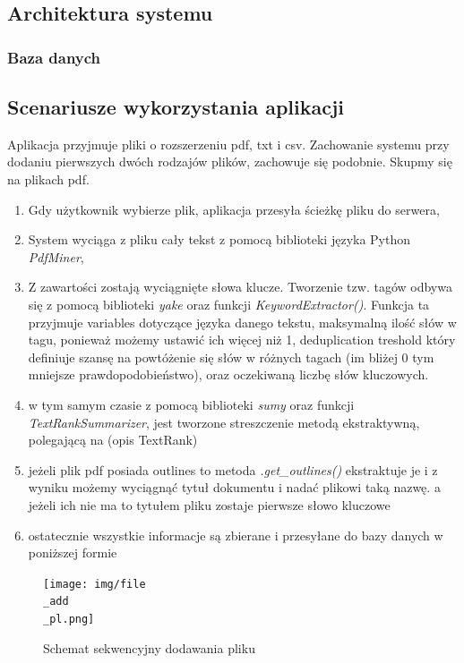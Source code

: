 \documentclass[12pt,a4paper,twoside]{article}
\begin{document}
\subsection{Architektura systemu} %
\subsubsection*{Baza danych}
\newpage
\subsection{Scenariusze wykorzystania aplikacji}
Aplikacja przyjmuje pliki o rozszerzeniu pdf, txt i csv. Zachowanie systemu przy dodaniu pierwszych dwóch rodzajów plików, zachowuje się podobnie. Skupmy się na plikach pdf.
\begin{enumerate}
	\item Gdy użytkownik wybierze plik, aplikacja przesyła ścieżkę pliku do serwera,
	\item System wyciąga z pliku cały tekst z pomocą biblioteki języka Python \textit{PdfMiner},
	\item Z zawartości zostają wyciągnięte słowa klucze. Tworzenie tzw. tagów odbywa się z pomocą biblioteki \textit{yake} oraz funkcji \textit{KeywordExtractor()}. Funkcja ta przyjmuje variables dotyczące języka danego tekstu, maksymalną ilość słów w tagu, ponieważ możemy ustawić ich więcej niż 1, deduplication treshold który definiuje szansę na powtóżenie się słów w różnych tagach (im bliżej 0 tym mniejsze prawdopodobieństwo), oraz oczekiwaną liczbę słów kluczowych. 
	\item w tym samym czasie z pomocą biblioteki \textit{sumy} oraz funkcji \textit{TextRankSummarizer}, jest tworzone streszczenie metodą ekstraktywną, polegającą na (opis TextRank)\
	\item jeżeli plik pdf posiada outlines to metoda \textit{.get\_outlines()} ekstraktuje je i z wyniku możemy wyciągnąć tytuł dokumentu i nadać plikowi taką nazwę. a jeżeli ich nie ma to tytułem pliku zostaje pierwsze słowo kluczowe
	\item ostatecznie wszystkie informacje są zbierane i przesyłane do bazy danych w poniższej formie
\end{enumerate}
\begin{figure}[h]
\centering
  \texttt{[image: img/file\\\_add\\\_pl.png]}
  \caption{Schemat sekwencyjny dodawania pliku}
\end{figure}
\end{document}
